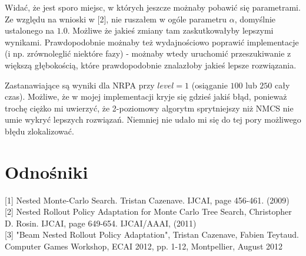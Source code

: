 \documentclass[a4paper,10pt]{article}
\begin{document}
Widać, że jest sporo miejsc, w których jeszcze możnaby pobawić się parametrami. Ze względu na wnioski w [2], nie ruszałem w ogóle parametru 
$\alpha$, domyślnie ustalonego na $1.0$. Możliwe że jakieś zmiany tam zaskutkowałyby lepszymi wynikami. Prawdopodobnie możnaby też wydajnościowo
poprawić implementacje (i np. zrównoleglić niektóre fazy) - możnaby wtedy uruchomić przeszukiwanie z większą głębokością, które prawdopodobnie
znalazłoby jakieś lepsze rozwiązania.

Zastanawiające są wyniki dla NRPA przy $level=1$ (osiąganie $100$ lub $250$ cały czas). Możliwe, że w mojej implementacji kryje się gdzieś jakiś
błąd, ponieważ trochę ciężko mi uwierzyć, że 2-poziomowy algorytm sprytniejszy niż NMCS nie umie wykryć lepszych rozwiązań. Niemniej nie udało mi
się do tej pory możliwego błędu zlokalizować.

\section{Odnośniki}
[1] Nested Monte-Carlo Search.
Tristan Cazenave. IJCAI, page 456-461. (2009) \\[0pt]
[2] Nested Rollout Policy Adaptation for Monte Carlo Tree Search,
Christopher D. Rosin. IJCAI, page 649-654. IJCAI/AAAI, (2011) \\[0pt]
[3] "Beam Nested Rollout Policy Adaptation", Tristan Cazenave,
Fabien Teytaud. Computer Games Workshop, ECAI 2012, pp. 1-12, Montpellier, August 2012
\end{document}
